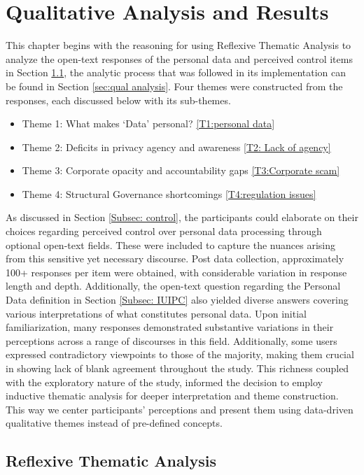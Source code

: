 \chapter{Qualitative Analysis and Results} \label{chapter: qual analysis&results}
This chapter begins with the reasoning for using Reflexive Thematic Analysis to analyze the open-text responses of the personal data and perceived control items in Section \ref{sec: Reflexive TA}, the analytic process that was followed in its implementation can be found in Section \ref{sec:qual analysis}. Four themes were constructed from the responses, each discussed below with its sub-themes.
\begin{itemize}
    \item Theme 1: What makes `Data' personal? \ref{T1:personal data} 
    \item Theme 2: Deficits in privacy agency and awareness \ref{T2: Lack of agency} 
    \item Theme 3: Corporate opacity and accountability gaps \ref{T3:Corporate scam} 
    \item Theme 4: Structural Governance shortcomings \ref{T4:regulation issues} 
\end{itemize}


As discussed in Section \ref{Subsec: control}, the participants could elaborate on their choices regarding perceived control over personal data processing through optional open-text fields. These were included to capture the nuances arising from this sensitive yet necessary discourse. Post data collection, approximately 100+ responses per item were obtained, with considerable variation in response length and depth. Additionally, the open-text question regarding the Personal Data definition in Section \ref{Subsec: IUIPC} also yielded diverse answers covering various interpretations of what constitutes personal data. Upon initial familiarization, many responses demonstrated substantive variations in their perceptions across a range of discourses in this field. Additionally, some users expressed contradictory viewpoints to those of the majority, making them crucial in showing lack of blank agreement throughout the study. This richness coupled with the exploratory nature of the study, informed the decision to employ inductive thematic analysis \cite{braun_using_2006} for deeper interpretation and theme construction. This way we center participants' perceptions and present them using data-driven qualitative themes instead of pre-defined concepts.

\section{Reflexive Thematic Analysis} \label{sec: Reflexive TA}

